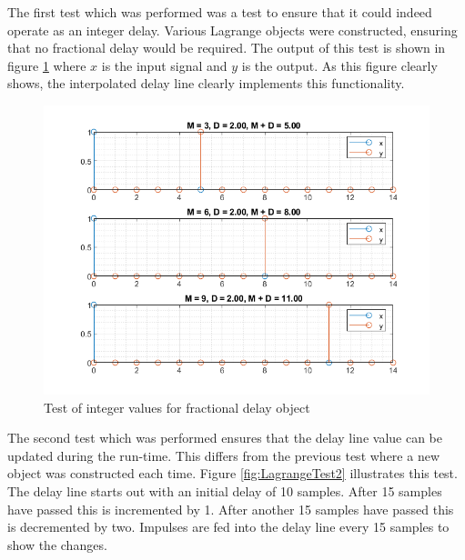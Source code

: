 \documentclass[../main.tex]{subfiles}
\begin{document}
The first test which was performed was a test to ensure that it could indeed operate as an integer delay. Various Lagrange objects were constructed, ensuring that no fractional delay would be required. The output of this test is shown in figure \ref{fig:LagrangeTest1} where $x$ is the input signal and $y$ is the output. As this figure clearly shows, the interpolated delay line clearly implements this functionality.

\begin{figure}[h]
    \centering
    \includegraphics[scale=.65]{./images/plots/LagrangeTest1.png}
    \caption{Test of integer values for fractional delay object}
    \label{fig:LagrangeTest1}
\end{figure}

The second test which was performed ensures that the delay line value can be updated during the run-time. This differs from the previous test where a new object was constructed each time. Figure \ref{fig:LagrangeTest2} illustrates this test. The delay line starts out with an initial delay of 10 samples. After 15 samples have passed this is incremented by 1. After another 15 samples have passed this is decremented by two. Impulses are fed into the delay line every 15 samples to show the changes.
\end{document}
